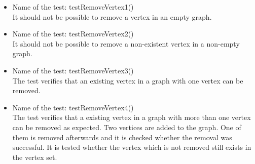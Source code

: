 \documentclass{article}
\begin{document}
\begin{itemize}	
	\item Name of the test: testRemoveVertex1()\\
	It should not be possible to remove a vertex in an empty graph.
	
	\item Name of the test: testRemoveVertex2()\\
	It should not be possible to remove a non-existent vertex in a non-empty graph.
	
	\item Name of the test: testRemoveVertex3()\\
	The test verifies that an existing vertex in a graph with one vertex can be removed.
	
	\item Name of the test: testRemoveVertex4()\\
	The test verifies that a existing vertex in a graph with more than one vertex can be removed as expected. Two vertices are added to the graph. One of them is removed afterwards and it is checked whether the removal was successful. It is tested whether the vertex which is not removed still exists in the vertex set.
	
\end{itemize}
\end{document}
